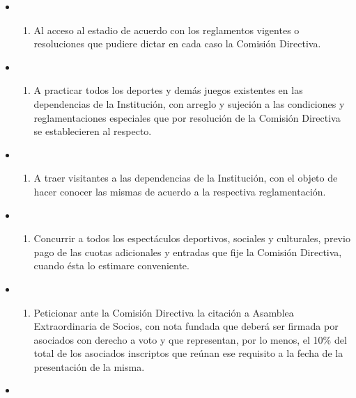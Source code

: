 \documentclass[]{book}
\providecommand{\tightlist}{%
  \setlength{\itemsep}{0pt}\setlength{\parskip}{0pt}}
\begin{document}
\begin{itemize}
\begin{itemize}
\begin{enumerate}
    \end{enumerate}
  \item
    \begin{enumerate}
    \def\labelenumi{\alph{enumi})}
    \setcounter{enumi}{5}
    \tightlist
    \item
      Al acceso al estadio de acuerdo con los reglamentos vigentes o resoluciones que pudiere dictar en cada caso la Comisión Directiva.
    \end{enumerate}
  \item
    \begin{enumerate}
    \def\labelenumi{\alph{enumi})}
    \setcounter{enumi}{6}
    \tightlist
    \item
      A practicar todos los deportes y demás juegos existentes en las dependencias de la Institución, con arreglo y sujeción a las condiciones y reglamentaciones especiales que por resolución de la Comisión Directiva se establecieren al respecto.
    \end{enumerate}
  \item
    \begin{enumerate}
    \def\labelenumi{\alph{enumi})}
    \setcounter{enumi}{7}
    \tightlist
    \item
      A traer visitantes a las dependencias de la Institución, con el objeto de hacer conocer las mismas de acuerdo a la respectiva reglamentación.
    \end{enumerate}
  \item
    \begin{enumerate}
    \def\labelenumi{\roman{enumi})}
    \tightlist
    \item
      Concurrir a todos los espectáculos deportivos, sociales y culturales, previo pago de las cuotas adicionales y entradas que fije la Comisión Directiva, cuando ésta lo estimare conveniente.
    \end{enumerate}
  \item
    \begin{enumerate}
    \def\labelenumi{\alph{enumi})}
    \setcounter{enumi}{9}
    \tightlist
    \item
      Peticionar ante la Comisión Directiva la citación a Asamblea Extraordinaria de Socios, con nota fundada que deberá ser firmada por asociados con derecho a voto y que representan, por lo menos, el 10\% del total de los asociados inscriptos que reúnan ese requisito a la fecha de la presentación de la misma.
    \end{enumerate}
  \item

\end{itemize}
\end{itemize}
\end{document}

